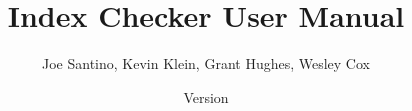 \documentclass[10pt]{report}
\title{Index Checker User Manual}
\author{Joe Santino, Kevin Klein, Grant Hughes, Wesley Cox}
\date{Version \ReleaseInfo{}}
\begin{document}

{\let\newpage\relax \maketitle}



\tableofcontents
\newpage



\htmlhr
%
%
\end{document}
